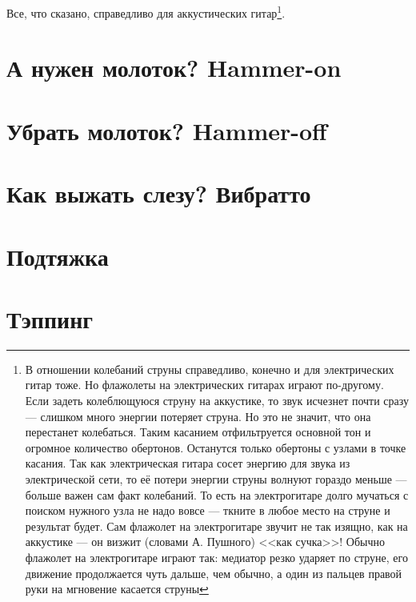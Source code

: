 Все, что сказано, справедливо для аккустических гитар\footnote{В отношении колебаний струны справедливо, конечно и для электрических гитар тоже. Но флажолеты на электрических гитарах играют по-другому. Если задеть колеблющуюся струну на аккустике, то звук исчезнет почти сразу --- слишком много энергии потеряет струна. Но это не значит, что она перестанет колебаться. Таким касанием отфильтруется основной тон и огромное количество обертонов. Останутся только обертоны с узлами в точке касания. Так как электрическая гитара сосет энергию для звука из электрической сети, то её потери энергии струны волнуют гораздо меньше --- больше важен сам факт колебаний. То есть на электрогитаре долго мучаться с поиском нужного узла не надо вовсе --- ткните в любое место на струне и результат будет. Сам флажолет на электрогитаре звучит не так изящно, как на аккустике --- он визжит (словами А. Пушного) <<как сучка>>! Обычно флажолет на электрогитаре играют так: медиатор резко ударяет по струне, его движение продолжается чуть дальше, чем обычно, а один из пальцев правой руки на мгновение касается струны}.


\section{А нужен молоток? Hammer-on}
\section{Убрать молоток? Hammer-off}
\section{Как выжать слезу? Вибратто}
\section{Подтяжка}
\section{Тэппинг}

